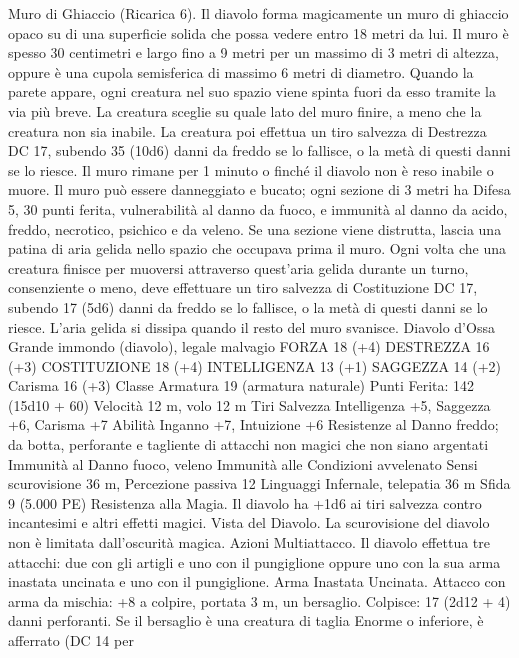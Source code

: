 \begin{multicols}{2}
Muro di Ghiaccio (Ricarica 6). Il diavolo forma magicamente
un muro di ghiaccio opaco su di una superficie solida che possa
vedere entro 18 metri da lui. Il muro è spesso 30 centimetri e
largo fino a 9 metri per un massimo di 3 metri di altezza, oppure
è una cupola semisferica di massimo 6 metri di diametro.
Quando la parete appare, ogni creatura nel suo spazio viene
spinta fuori da esso tramite la via più breve. La creatura sceglie
su quale lato del muro finire, a meno che la creatura non sia
inabile. La creatura poi effettua un tiro salvezza di Destrezza DC
17, subendo 35 (10d6) danni da freddo se lo fallisce, o la metà di
questi danni se lo riesce.
Il muro rimane per 1 minuto o finché il diavolo non è reso
inabile o muore. Il muro può essere danneggiato e bucato; ogni
sezione di 3 metri ha Difesa 5, 30 punti ferita, vulnerabilità al danno
da fuoco, e immunità al danno da acido, freddo, necrotico,
psichico e da veleno. Se una sezione viene distrutta, lascia una
patina di aria gelida nello spazio che occupava prima il muro.
Ogni volta che una creatura finisce per muoversi attraverso
quest’aria gelida durante un turno, consenziente o meno, deve
effettuare un tiro salvezza di Costituzione DC 17, subendo 17
(5d6) danni da freddo se lo fallisce, o la metà di questi danni se
lo riesce. L’aria gelida si dissipa quando il resto del muro
svanisce.
Diavolo d’Ossa
Grande immondo (diavolo), legale malvagio
FORZA 18 (+4)
DESTREZZA 16 (+3)
COSTITUZIONE 18 (+4)
INTELLIGENZA 13 (+1)
SAGGEZZA 14 (+2)
Carisma 16 (+3)
Classe Armatura 19 (armatura naturale)
\hspace*{0pt}\hfill{Punti Ferita}: 142 (15d10 + 60)
Velocità 12 m, volo 12 m
Tiri Salvezza Intelligenza +5, Saggezza +6, Carisma +7
Abilità Inganno +7, Intuizione +6
Resistenze al Danno freddo; da botta, perforante e tagliente
di attacchi non magici che non siano argentati
Immunità al Danno fuoco, veleno
Immunità alle Condizioni avvelenato
Sensi scurovisione 36 m, Percezione passiva 12
Linguaggi Infernale, telepatia 36 m
Sfida 9 (5.000 PE)
Resistenza alla Magia. Il diavolo ha +1d6 ai tiri salvezza
contro incantesimi e altri effetti magici.
Vista del Diavolo. La scurovisione del diavolo non è limitata
dall’oscurità magica.
Azioni
Multiattacco. Il diavolo effettua tre attacchi: due con gli artigli e
uno con il pungiglione oppure uno con la sua arma inastata
uncinata e uno con il pungiglione.
Arma Inastata Uncinata. Attacco con arma da mischia: +8 a
colpire, portata 3 m, un bersaglio.
Colpisce: 17 (2d12 + 4) danni perforanti. Se il bersaglio è una
creatura di taglia Enorme o inferiore, è afferrato (DC 14 per

\end{multicols}
